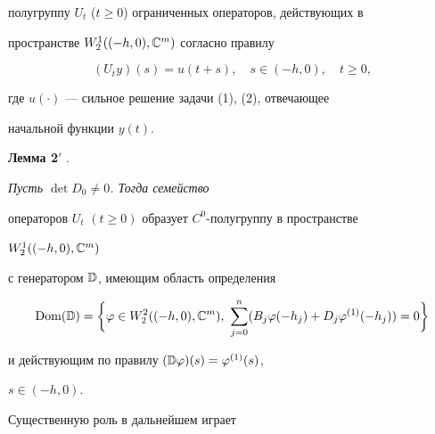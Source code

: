 полугруппу $U_t$ ($t\ge0$) ограниченных операторов, действующих в 


пространстве $W^1_2((-h,0),\Bbb C^m)$ согласно правилу 


$$ 


(U_t y)(s)=u(t+s),\quad s\in(-h,0),\quad t\ge0, 


$$ 


где $u(\cdot)$ --- сильное решение задачи (1), (2), отвечающее 


начальной функции $y(t)$. 


\medskip





{\bf Лемма 2$'$} \cite{11}. {\it Пусть $\det 


D_0\ne0$. Тогда семейство 


операторов $U_t$ $(t\ge0)$ образует $C^0$-полугруппу в пространстве 


$W^1_2((-h,0),\Bbb C^m)$ 


с генератором $\Bbb D$, имеющим область определения 


$$ 


\Dom(\Bbb D)=\bigg\{\varphi\in W^2_2((-h,0),\Bbb C^m), 


\ \sum^n_{j=0} (B_j\varphi(-h_j)+D_j\varphi^{(1)}(-h_j)) 


=0\bigg\} 


$$ 


и действующим по правилу $(\Bbb D\varphi)(s)=\varphi^{(1)}(s)$, 


$s\in(-h,0)$. 


}


\medskip


 


Существенную роль в дальнейшем играет 


 


